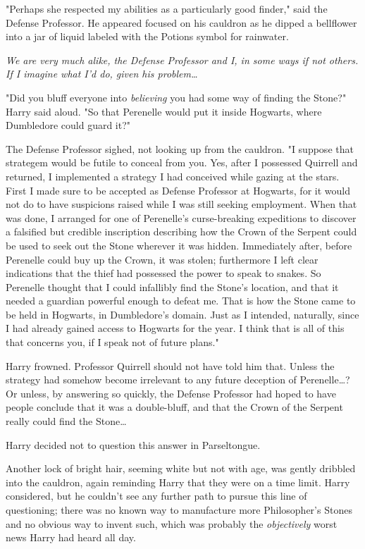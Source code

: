 "Perhaps she respected my abilities as a particularly good finder," said the 
Defense Professor. He appeared focused on his cauldron as he dipped a 
bellflower into a jar of liquid labeled with the Potions symbol for rainwater.

\emph{We are very much alike, the Defense Professor and I, in some ways if not 
others. If I imagine what I'd do, given his problem{\ldots}}

"Did you bluff everyone into \emph{believing} you had some way of finding the 
Stone?" Harry said aloud. "So that Perenelle would put it inside Hogwarts, 
where Dumbledore could guard it?"

The Defense Professor sighed, not looking up from the cauldron. "I suppose that 
strategem would be futile to conceal from you. Yes, after I possessed Quirrell 
and returned, I implemented a strategy I had conceived while gazing at the 
stars. First I made sure to be accepted as Defense Professor at Hogwarts, for 
it would not do to have suspicions raised while I was still seeking employment. 
When that was done, I arranged for one of Perenelle's curse-breaking 
expeditions to discover a falsified but credible inscription describing how the 
Crown of the Serpent could be used to seek out the Stone wherever it was 
hidden. Immediately after, before Perenelle could buy up the Crown, it was 
stolen; furthermore I left clear indications that the thief had possessed the 
power to speak to snakes. So Perenelle thought that I could infallibly find the 
Stone's location, and that it needed a guardian powerful enough to defeat me. 
That is how the Stone came to be held in Hogwarts, in Dumbledore's domain. Just 
as I intended, naturally, since I had already gained access to Hogwarts for the 
year. I think that is all of this that concerns you, if I speak not of future 
plans."

Harry frowned. Professor Quirrell should not have told him that. Unless the 
strategy had somehow become irrelevant to any future deception of 
Perenelle{\ldots}? Or unless, by answering so quickly, the Defense Professor 
had hoped to have people conclude that it was a double-bluff, and that the 
Crown of the Serpent really could find the Stone{\ldots}

Harry decided not to question this answer in Parseltongue.

Another lock of bright hair, seeming white but not with age, was gently 
dribbled into the cauldron, again reminding Harry that they were on a time 
limit. Harry considered, but he couldn't see any further path to pursue this 
line of questioning; there was no known way to manufacture more Philosopher's 
Stones and no obvious way to invent such, which was probably the 
\emph{objectively} worst news Harry had heard all day.

